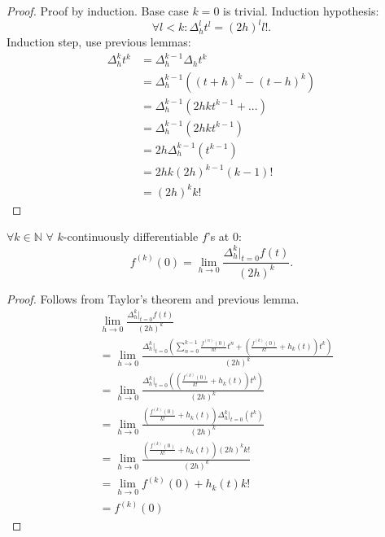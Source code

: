\documentclass[a4paper,12pt]{article}
\begin{document}
\begin{proof}
    Proof by induction. Base case $k=0$ is trivial. Induction hypothesis:
    \begin{equation}
        \forall l<k:  \Delta^{l}_{h} t^{l} = (2h)^{l} l!.
    \end{equation}
    Induction step, use previous lemmas:
    \begin{align}
        \Delta^{k}_{h} t^{k} & = \Delta^{k-1}_{h}\Delta_{h} t^{k}                     \\
                             & = \Delta^{k-1}_{h}\left( (t+h)^{k} - (t-h)^{k} \right) \\
                             & = \Delta^{k-1}_{h}\left( 2hk t^{k-1} + ... \right)     \\
                             & = \Delta^{k-1}_{h}\left( 2hk t^{k-1}\right)            \\
                             & =2h  \Delta^{k-1}_{h}\left( t^{k-1}\right)             \\
                             & =2hk  (2h)^{k-1} (k-1)!                                \\
                             & =  (2h)^{k} k!
    \end{align}
\end{proof}


\begin{theorem}
    $\forall k \in \mathbb{N}$ $\forall$  $k$-continuously differentiable $f$'s at $0$:
    \begin{equation}
        f^{(k)}(0) = \lim_{h \to 0} \frac{\Delta^{k}_{h}|_{t=0} f(t)}{(2h)^{k}}.
    \end{equation}
\end{theorem}

\begin{proof}
    Follows from Taylor's theorem and previous lemma.
    \begin{align}
         & \lim_{h \to 0} \frac{\Delta^{k}_{h}|_{t=0} f(t)}{(2h)^{k}}                                                                   \\
         & = \lim_{h \to 0} \frac{\Delta^{k}_{h}|_{t=0} \left( \sum_{n=0}^{k-1} \frac{f^{(n)}(0)}{n!} t^n
        + \left(\frac{f^{(k)}(0)}{k!} + h_{k}(t)\right)t^{k} \right)  }{(2h)^{k}}                                                       \\
         & = \lim_{h \to 0} \frac{\Delta^{k}_{h}|_{t=0} \left( \left(\frac{f^{(k)}(0)}{k!} + h_{k}(t)\right)t^{k} \right)  }{(2h)^{k}}  \\
         & = \lim_{h \to 0} \frac{\left(\frac{f^{(k)}(0)}{k!} + h_{k}(t)\right) \Delta^{k}_{h}|_{t=0} \left( t^{k} \right)  }{(2h)^{k}} \\
         & = \lim_{h \to 0} \frac{\left(\frac{f^{(k)}(0)}{k!} + h_{k}(t)\right) (2h)^{k} k!  }{(2h)^{k}}                                \\
         & = \lim_{h \to 0} f^{(k)}(0) + h_{k}(t) k!                                                                                    \\
         & = f^{(k)}(0)
    \end{align}
\end{proof}
\end{document}
